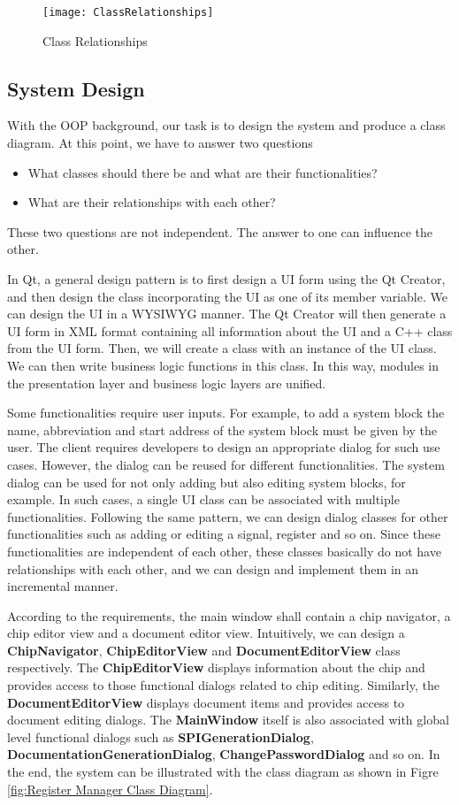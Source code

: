 \begin{figure}[htb]
\centering
\texttt{[image: ClassRelationships]}
\caption{Class Relationships\label{fig:Class Relationships}}
\end{figure}

\subsection{System Design}
With the OOP background, our task is to design the system and produce a class diagram.  At this point, we have to answer two questions
\begin{itemize}
\item What classes should there be and what are their functionalities?
\item What are their relationships with each other?
\end{itemize}
These two questions are not independent. The answer to one can influence the other.

In Qt, a general design pattern is to first design a UI form using the Qt Creator, and then design the class incorporating the UI as one of its member variable. We can design the UI in a WYSIWYG manner. The Qt Creator will then generate a UI form in XML format containing all information about the UI and a C++ class from the UI form. Then, we will create a class with an instance of the UI class. We can then write business logic functions in this class. In this way, modules in the presentation layer and business logic layers are unified. 

Some functionalities require user inputs. For example, to add a system block the name, abbreviation and start address of the system block must be given by the user. The client requires developers to design an appropriate dialog for such use cases. However, the dialog can be reused for different functionalities. The system dialog can be used for not only adding but also editing system blocks, for example. In such cases, a single UI class can be associated with multiple functionalities. Following the same pattern, we can design dialog classes for other functionalities such as adding or editing a signal, register and so on. Since these functionalities are independent of each other, these classes basically do not have relationships with each other, and we can design and implement them in an incremental manner.

According to the requirements, the main window shall contain a chip navigator, a chip editor view and a document editor view. Intuitively, we can design a \textbf{ChipNavigator}, \textbf{ChipEditorView} and \textbf{DocumentEditorView} class respectively. The \textbf{ChipEditorView} displays information about the chip and provides access to those functional dialogs related to chip editing. Similarly, the \textbf{DocumentEditorView} displays document items and provides access to document editing dialogs. The \textbf{MainWindow} itself is also associated with global level functional dialogs such as \textbf{SPIGenerationDialog}, \textbf{DocumentationGenerationDialog}, \textbf{ChangePasswordDialog} and so on. In the end, the system can be illustrated with the class diagram as shown in Figre \ref{fig:Register Manager Class Diagram}.

